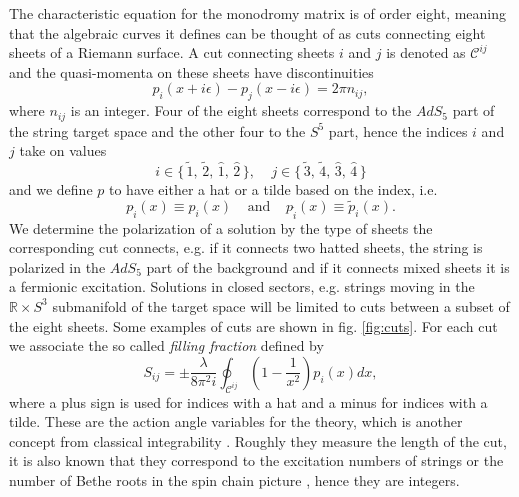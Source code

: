 The characteristic equation for the monodromy matrix is of order eight, meaning that the algebraic curves it defines can be thought of as cuts connecting eight sheets of a Riemann surface. A cut connecting sheets $i$ and $j$ is denoted as $\mathcal{C}^{ij}$ and the quasi-momenta on these sheets have discontinuities
\begin{equation}
	p_i(x + i\epsilon) - p_j(x - i\epsilon) = 2 \pi n_{ij},
	\label{eq:cut_condition}
\end{equation}  
where $n_{ij}$ is an integer. Four of the eight sheets correspond to the $AdS_5$ part of the string target space and the other four to the $S^5$ part, hence the indices $i$ and $j$ take on values
\begin{equation}
	i \in \{ \, \tilde{1}, \, \tilde{2}, \, \hat{1}, \, \hat{2} \, \}, \;\;\;\; j \in \{ \, \tilde{3}, \, \tilde{4}, \, \hat{3}, \, \hat{4} \, \}
\end{equation}
and we define $p$ to have either a hat or a tilde based on the index, i.e. 
\begin{equation}
	p_{\hat{i}} (x) \equiv \hat{p}_i (x) \;\;\;\; \mathrm{and} \;\;\;\; p_{\tilde{i}} (x) \equiv \tilde{p}_i (x).
\end{equation}
We determine the polarization of a solution by the type of sheets the corresponding cut connects, e.g. if it connects two hatted sheets, the string is polarized in the $AdS_5$ part of the background and if it connects mixed sheets it is a fermionic excitation. Solutions in closed sectors, e.g. strings moving in the $\mathbb{R} \times S^3$ submanifold of the target space will be limited to cuts between a subset of the eight sheets. Some examples of cuts are shown in fig. \ref{fig:cuts}. For each cut we associate the so called \emph{filling fraction} defined by
\begin{equation}
	S_{ij} = \pm \frac{\lambda}{8 \pi^2 i} \oint_{\mathcal{C}^{ij}} \left( 1 - \frac{1}{x^2} \right) p_i(x) dx,
\end{equation}
where a plus sign is used for indices with a hat and a minus for indices with a tilde. These are the action angle variables for the theory, which is another concept from classical integrability \cite{action_variables}. Roughly they measure the length of the cut, it is also known that they correspond to the excitation numbers of strings or the number of Bethe roots in the spin chain picture \cite{action_variables2}, hence they are integers. 

